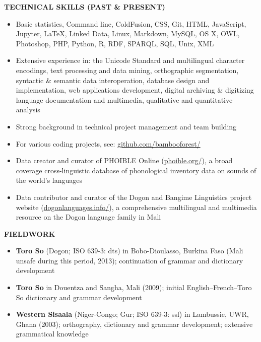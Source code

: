 \documentclass[11pt]{article}
\begin{document}
\clearpage
\vskip 24pt
\begin{flushleft}
{\bf TECHNICAL SKILLS (PAST \& PRESENT)}
\end{flushleft}
\begin{itemize}
\item Basic statistics, Command line, ColdFusion, CSS, Git, HTML, JavaScript, Jupyter, \LaTeX, Linked Data, Linux, Markdown, MySQL, OS X, OWL, Photoshop, PHP, Python, R, RDF, SPARQL, SQL, Unix, XML
\item Extensive experience in: the Unicode Standard and multilingual character encodings, text processing and data mining, orthographic segmentation, syntactic \& semantic data interoperation, database design and implementation, web applications development, digital archiving \& digitizing language documentation and multimedia, qualitative and quantitative analysis
\item Strong background in technical project management and team building
\item For various coding projects, see: \href{https://github.com/bambooforest/}{github.com/bambooforest/}
\item Data creator and curator of PHOIBLE Online (\href{https://phoible.org/}{phoible.org/}), a broad coverage cross-linguistic database of phonological inventory data on sounds of the world's languages
\item Data contributor and curator of the Dogon and Bangime Linguistics project website (\href{http://dogonlanguages.info/}{dogonlanguages.info/}), a comprehensive multilingual and multimedia resource on the Dogon language family in Mali
\end{itemize}

\begin{flushleft}
{\bf FIELDWORK}
\end{flushleft}
\begin{itemize}
\item {\bf Toro So} (Dogon; ISO 639-3: dts) in Bobo-Dioulasso, Burkina Faso (Mali unsafe during this period, 2013); continuation of grammar and dictionary development
\item {\bf Toro So} in Douentza and Sangha, Mali (2009); initial English--French--Toro So dictionary and grammar development
\item {\bf Western Sisaala} (Niger-Congo; Gur; ISO 639-3: ssl) in Lambussie, UWR, Ghana (2003); orthography, dictionary and grammar development; extensive grammatical knowledge
\end{itemize}
\end{document}
